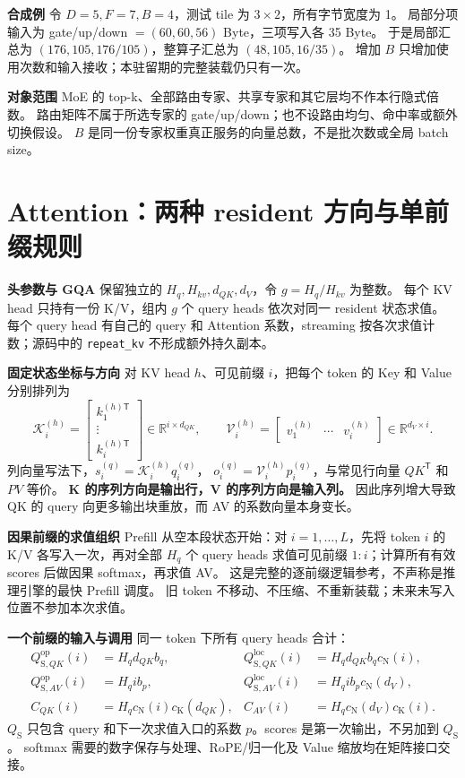 \documentclass[11pt,a4paper,fontset=fandol]{ctexart}
\newcommand{\op}{\mathrm{op}}
\newcommand{\loc}{\mathrm{loc}}
\newcommand{\cn}[1]{c_{\mathrm N}\!\left(#1\right)}
\newcommand{\ck}[1]{c_{\mathrm K}\!\left(#1\right)}
\newcommand{\qs}{Q_{\mathrm S}}
\newcommand{\para}[1]{\par\smallskip\noindent\textbf{#1}\quad}
\begin{document}
\para{合成例}
令 $D=5,F=7,B=4$，测试 tile 为 $3\times2$，所有字节宽度为 1。
局部分项输入为 gate/up/down $=(60,60,56)$ Byte，三项写入各 35 Byte。
于是局部汇总为 $(176,105,176/105)$，整算子汇总为 $(48,105,16/35)$。
增加 $B$ 只增加使用次数和输入接收；本驻留期的完整装载仍只有一次。

\para{对象范围}
MoE 的 top-k、全部路由专家、共享专家和其它层均不作本行隐式倍数。
路由矩阵不属于所选专家的 gate/up/down；也不设路由均匀、命中率或额外切换假设。
$B$ 是同一份专家权重真正服务的向量总数，不是批次数或全局 batch size。

\clearpage
\section{Attention：两种 resident 方向与单前缀规则}
\para{头参数与 GQA}
保留独立的 $H_q,H_{kv},d_{QK},d_V$，令 $g=H_q/H_{kv}$ 为整数。
每个 KV head 只持有一份 K/V，组内 $g$ 个 query heads 依次对同一 resident 状态求值\cite{gqa}。
每个 query head 有自己的 query 和 Attention 系数，streaming 按各次求值计数；源码中的 \texttt{repeat\_kv} 不形成额外持久副本。

\para{固定状态坐标与方向}
对 KV head $h$、可见前缀 $i$，把每个 token 的 Key 和 Value 分别排列为
\begin{equation}
\mathcal K_i^{(h)}=
\begin{bmatrix}k_1^{(h)\mathsf T}\\\vdots\\k_i^{(h)\mathsf T}\end{bmatrix}
\in\mathbb R^{i\times d_{QK}},\qquad
\mathcal V_i^{(h)}=
\begin{bmatrix}v_1^{(h)}&\cdots&v_i^{(h)}\end{bmatrix}
\in\mathbb R^{d_V\times i}.
\end{equation}
列向量写法下，$s_i^{(q)}=\mathcal K_i^{(h)}q_i^{(q)}$，
$o_i^{(q)}=\mathcal V_i^{(h)}p_i^{(q)}$，与常见行向量 $QK^{\mathsf T}$ 和 $PV$ 等价\cite{attention}。
\textbf{K 的序列方向是输出行，V 的序列方向是输入列。}
因此序列增大导致 QK 的 query 向更多输出块重放，而 AV 的系数向量本身变长。

\para{因果前缀的求值组织}
Prefill 从空本段状态开始：对 $i=1,\ldots,L$，先将 token $i$ 的 K/V 各写入一次，再对全部 $H_q$ 个 query heads 求值可见前缀 $1{:}i$；计算所有有效 scores 后做因果 softmax，再求值 AV。
这是完整的逐前缀逻辑参考，不声称是推理引擎的最快 Prefill 调度。
旧 token 不移动、不压缩、不重新装载；未来未写入位置不参加本次求值。

\para{一个前缀的输入与调用}
同一 token 下所有 query heads 合计：
\begin{align}
Q_{\mathrm S,QK}^{\op}(i)&=H_qd_{QK}b_q,&
Q_{\mathrm S,QK}^{\loc}(i)&=H_qd_{QK}b_q\cn{i},\label{eq:prefix-qk}\\
Q_{\mathrm S,AV}^{\op}(i)&=H_q i b_p,&
Q_{\mathrm S,AV}^{\loc}(i)&=H_q i b_p\cn{d_V},\label{eq:one-prefix}\\
C_{QK}(i)&=H_q\cn{i}\ck{d_{QK}},&
C_{AV}(i)&=H_q\cn{d_V}\ck{i}.\label{eq:prefix-calls}
\end{align}
$\qs$ 只包含 query 和下一次求值入口的系数 $p$。scores 是第一次输出，不另加到 $\qs$。
softmax 需要的数字保存与处理、RoPE/归一化及 Value 缩放均在矩阵接口交接。
\end{document}
